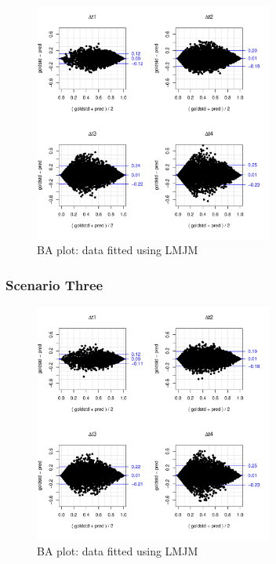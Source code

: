 \documentclass{article}
\begin{document}
\begin{figure}[H]
\centering
\includegraphics[width=0.7\textwidth]{qt50data_normpred_more.pdf}
\caption{BA plot: data fitted using LMJM}
\end{figure}



\subsubsection*{Scenario Three}
\begin{figure}[H]
\centering
\includegraphics[width=0.7\textwidth]{normdata_normpred_more.pdf}
\caption{BA plot: data fitted using LMJM}
\end{figure}
\end{document}
